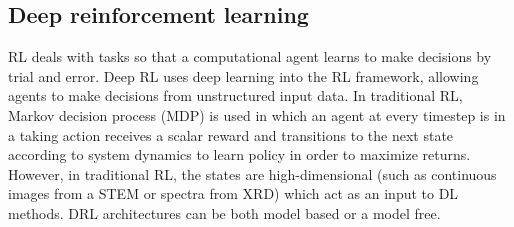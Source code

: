\documentclass[pdflatex,sn-mathphys]{sn-jnl}%
\theoremstyle{thmstyleone}%
\theoremstyle{thmstyletwo}%
\theoremstyle{thmstylethree}%
\begin{document}
\subsection{Deep reinforcement learning}\label{sec:rl}

RL deals with tasks so that a computational agent learns to make decisions by trial and error. Deep RL uses deep learning into the RL framework, allowing agents to make decisions from unstructured input data. In traditional RL, Markov decision process (MDP) is used in which an agent at every timestep is in a taking action receives a scalar reward and transitions to the next state according to system dynamics to learn policy in order to maximize returns. However, in traditional RL, the states are high-dimensional (such as continuous images from a STEM or spectra from XRD) which act as an input to DL methods. DRL architectures can be both model based or a model free.
\end{document}
